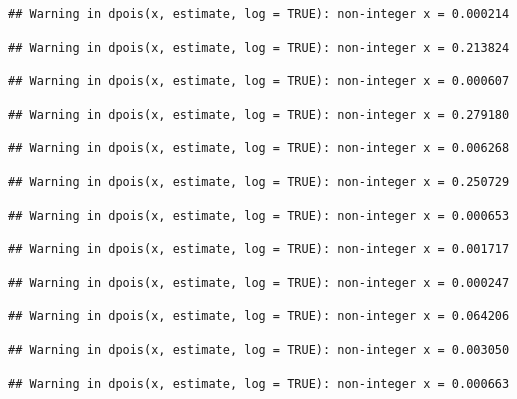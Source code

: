 \documentclass[]{article}
\begin{document}
\begin{verbatim}
## Warning in dpois(x, estimate, log = TRUE): non-integer x = 0.000214
\end{verbatim}

\begin{verbatim}
## Warning in dpois(x, estimate, log = TRUE): non-integer x = 0.213824
\end{verbatim}

\begin{verbatim}
## Warning in dpois(x, estimate, log = TRUE): non-integer x = 0.000607
\end{verbatim}

\begin{verbatim}
## Warning in dpois(x, estimate, log = TRUE): non-integer x = 0.279180
\end{verbatim}

\begin{verbatim}
## Warning in dpois(x, estimate, log = TRUE): non-integer x = 0.006268
\end{verbatim}

\begin{verbatim}
## Warning in dpois(x, estimate, log = TRUE): non-integer x = 0.250729
\end{verbatim}

\begin{verbatim}
## Warning in dpois(x, estimate, log = TRUE): non-integer x = 0.000653
\end{verbatim}

\begin{verbatim}
## Warning in dpois(x, estimate, log = TRUE): non-integer x = 0.001717
\end{verbatim}

\begin{verbatim}
## Warning in dpois(x, estimate, log = TRUE): non-integer x = 0.000247
\end{verbatim}

\begin{verbatim}
## Warning in dpois(x, estimate, log = TRUE): non-integer x = 0.064206
\end{verbatim}

\begin{verbatim}
## Warning in dpois(x, estimate, log = TRUE): non-integer x = 0.003050
\end{verbatim}

\begin{verbatim}
## Warning in dpois(x, estimate, log = TRUE): non-integer x = 0.000663
\end{verbatim}
\end{document}
